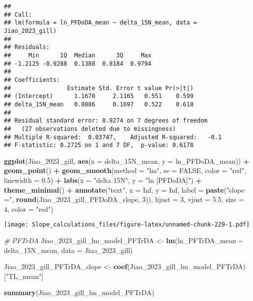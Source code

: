 \documentclass[
]{article}
\newenvironment{Shaded}{\begin{snugshade}}{\end{snugshade}}
\newcommand{\AttributeTok}[1]{\textcolor[rgb]{0.13,0.29,0.53}{#1}}
\newcommand{\CommentTok}[1]{\textcolor[rgb]{0.56,0.35,0.01}{\textit{#1}}}
\newcommand{\ConstantTok}[1]{\textcolor[rgb]{0.56,0.35,0.01}{#1}}
\newcommand{\DecValTok}[1]{\textcolor[rgb]{0.00,0.00,0.81}{#1}}
\newcommand{\FloatTok}[1]{\textcolor[rgb]{0.00,0.00,0.81}{#1}}
\newcommand{\FunctionTok}[1]{\textcolor[rgb]{0.13,0.29,0.53}{\textbf{#1}}}
\newcommand{\NormalTok}[1]{#1}
\newcommand{\OtherTok}[1]{\textcolor[rgb]{0.56,0.35,0.01}{#1}}
\newcommand{\SpecialCharTok}[1]{\textcolor[rgb]{0.81,0.36,0.00}{\textbf{#1}}}
\newcommand{\StringTok}[1]{\textcolor[rgb]{0.31,0.60,0.02}{#1}}
\begin{document}
\begin{verbatim}
## 
## Call:
## lm(formula = ln_PFDoDA_mean ~ delta_15N_mean, data = Jiao_2023_gill)
## 
## Residuals:
##     Min      1Q  Median      3Q     Max 
## -1.2125 -0.9288  0.1388  0.8184  0.9794 
## 
## Coefficients:
##                Estimate Std. Error t value Pr(>|t|)
## (Intercept)      1.1670     2.1165   0.551    0.599
## delta_15N_mean   0.0886     0.1697   0.522    0.618
## 
## Residual standard error: 0.9274 on 7 degrees of freedom
##   (27 observations deleted due to missingness)
## Multiple R-squared:  0.03747,    Adjusted R-squared:   -0.1 
## F-statistic: 0.2725 on 1 and 7 DF,  p-value: 0.6178
\end{verbatim}

\begin{Shaded}
\begin{Highlighting}[]
\FunctionTok{ggplot}\NormalTok{(Jiao\_2023\_gill, }\FunctionTok{aes}\NormalTok{(}\AttributeTok{x =}\NormalTok{ delta\_15N\_mean, }\AttributeTok{y =}\NormalTok{ ln\_PFDoDA\_mean)) }\SpecialCharTok{+}
  \FunctionTok{geom\_point}\NormalTok{() }\SpecialCharTok{+}
  \FunctionTok{geom\_smooth}\NormalTok{(}\AttributeTok{method =} \StringTok{"lm"}\NormalTok{, }\AttributeTok{se =} \ConstantTok{FALSE}\NormalTok{, }\AttributeTok{color =} \StringTok{"red"}\NormalTok{, }\AttributeTok{linewidth =} \FloatTok{0.5}\NormalTok{) }\SpecialCharTok{+}
  \FunctionTok{labs}\NormalTok{(}\AttributeTok{x =} \StringTok{"delta 15N"}\NormalTok{,}
       \AttributeTok{y =} \StringTok{"ln [PFDoDA]"}\NormalTok{) }\SpecialCharTok{+}
  \FunctionTok{theme\_minimal}\NormalTok{() }\SpecialCharTok{+}
  \FunctionTok{annotate}\NormalTok{(}\StringTok{"text"}\NormalTok{, }\AttributeTok{x =} \ConstantTok{Inf}\NormalTok{, }\AttributeTok{y =} \ConstantTok{Inf}\NormalTok{, }\AttributeTok{label =} \FunctionTok{paste}\NormalTok{(}\StringTok{"slope ="}\NormalTok{, }\FunctionTok{round}\NormalTok{(Jiao\_2023\_gill\_PFDoDA\_slope, }\DecValTok{3}\NormalTok{)), }
           \AttributeTok{hjust =} \DecValTok{3}\NormalTok{, }\AttributeTok{vjust =} \FloatTok{5.5}\NormalTok{, }\AttributeTok{size =} \DecValTok{4}\NormalTok{, }\AttributeTok{color =} \StringTok{"red"}\NormalTok{)}
\end{Highlighting}
\end{Shaded}

\texttt{[image: Slope\_calculations\_files/figure-latex/unnamed-chunk-229-1.pdf]}

\begin{Shaded}
\begin{Highlighting}[]
\CommentTok{\# PFTrDA}
\NormalTok{Jiao\_2023\_gill\_lm\_model\_PFTrDA }\OtherTok{\textless{}{-}} \FunctionTok{lm}\NormalTok{(ln\_PFTrDA\_mean }\SpecialCharTok{\textasciitilde{}}\NormalTok{ delta\_15N\_mean,}
                                    \AttributeTok{data =}\NormalTok{ Jiao\_2023\_gill)}

\NormalTok{Jiao\_2023\_gill\_PFTrDA\_slope }\OtherTok{\textless{}{-}} \FunctionTok{coef}\NormalTok{(Jiao\_2023\_gill\_lm\_model\_PFTrDA)[}\StringTok{"TL\_mean"}\NormalTok{]}

\FunctionTok{summary}\NormalTok{(Jiao\_2023\_gill\_lm\_model\_PFTrDA)}
\end{Highlighting}
\end{Shaded}
\end{document}
